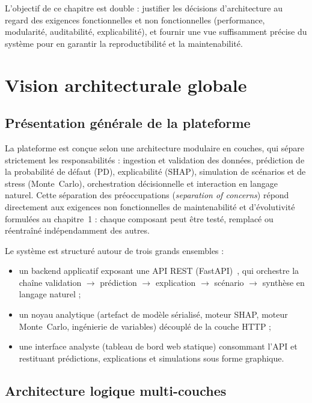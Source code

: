 \documentclass[a4paper,12pt,oneside]{report}
\begin{document}
L'objectif de ce chapitre est double : justifier les décisions d'architecture au
regard des exigences fonctionnelles et non fonctionnelles (performance, modularité,
auditabilité, explicabilité), et fournir une vue suffisamment précise du système
pour en garantir la reproductibilité et la maintenabilité.

\section{Vision architecturale globale}

\subsection{Présentation générale de la plateforme}

La plateforme est conçue selon une architecture modulaire en couches, qui
sépare strictement les responsabilités : ingestion et validation des données,
prédiction de la probabilité de défaut (PD), explicabilité (SHAP), simulation de
scénarios et de stress (Monte~Carlo), orchestration décisionnelle et interaction en
langage naturel. Cette séparation des préoccupations
(\textit{separation of concerns}) répond directement aux exigences non
fonctionnelles de maintenabilité et d'évolutivité formulées au chapitre~1 : chaque
composant peut être testé, remplacé ou réentraîné indépendamment des autres.

Le système est structuré autour de trois grands ensembles :

\begin{itemize}
  \item un backend applicatif exposant une API REST (FastAPI)~\cite{fastapi}, qui
        orchestre la chaîne validation $\rightarrow$ prédiction $\rightarrow$
        explication $\rightarrow$ scénario $\rightarrow$ synthèse en langage naturel ;
  \item un noyau analytique (artefact de modèle sérialisé, moteur SHAP,
        moteur Monte~Carlo, ingénierie de variables) découplé de la couche HTTP ;
  \item une interface analyste (tableau de bord web statique) consommant
        l'API et restituant prédictions, explications et simulations sous forme
        graphique.
\end{itemize}

\subsection{Architecture logique multi-couches}
\end{document}
